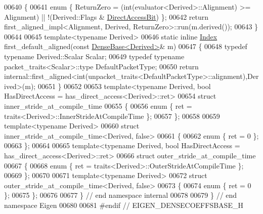 \begin{DoxyCode}
00640 \{
00641   \textcolor{keyword}{enum} \{ ReturnZero = (int(evaluator<Derived>::Alignment) >= Alignment) || !(Derived::Flags & 
      \hyperlink{group__flags_gabf1e9d0516a933445a4c307ad8f14915}{DirectAccessBit}) \};
00642   \textcolor{keywordflow}{return} first\_aligned\_impl<Alignment, Derived, ReturnZero>::run(m.derived());
00643 \}
00644 
00645 \textcolor{keyword}{template}<\textcolor{keyword}{typename} Derived>
00646 \textcolor{keyword}{static} \textcolor{keyword}{inline} \hyperlink{group___core___module_a554f30542cc2316add4b1ea0a492ff02}{Index} first\_default\_aligned(\textcolor{keyword}{const} \hyperlink{group___core___module_class_eigen_1_1_dense_base}{DenseBase<Derived>}& m)
00647 \{
00648   \textcolor{keyword}{typedef} \textcolor{keyword}{typename} Derived::Scalar Scalar;
00649   \textcolor{keyword}{typedef} \textcolor{keyword}{typename} packet\_traits<Scalar>::type DefaultPacketType;
00650   \textcolor{keywordflow}{return} internal::first\_aligned<int(unpacket\_traits<DefaultPacketType>::alignment),Derived>(m);
00651 \}
00652 
00653 template<typename Derived, bool HasDirectAccess = has\_direct\_access<Derived>::ret>
00654 \textcolor{keyword}{struct }inner\_stride\_at\_compile\_time
00655 \{
00656   \textcolor{keyword}{enum} \{ ret = traits<Derived>::InnerStrideAtCompileTime \};
00657 \};
00658 
00659 \textcolor{keyword}{template}<\textcolor{keyword}{typename} Derived>
00660 \textcolor{keyword}{struct }inner\_stride\_at\_compile\_time<Derived, false>
00661 \{
00662   \textcolor{keyword}{enum} \{ ret = 0 \};
00663 \};
00664 
00665 template<typename Derived, bool HasDirectAccess = has\_direct\_access<Derived>::ret>
00666 \textcolor{keyword}{struct }outer\_stride\_at\_compile\_time
00667 \{
00668   \textcolor{keyword}{enum} \{ ret = traits<Derived>::OuterStrideAtCompileTime \};
00669 \};
00670 
00671 \textcolor{keyword}{template}<\textcolor{keyword}{typename} Derived>
00672 \textcolor{keyword}{struct }outer\_stride\_at\_compile\_time<Derived, false>
00673 \{
00674   \textcolor{keyword}{enum} \{ ret = 0 \};
00675 \};
00676 
00677 \} \textcolor{comment}{// end namespace internal}
00678 
00679 \} \textcolor{comment}{// end namespace Eigen}
00680 
00681 \textcolor{preprocessor}{#endif // EIGEN\_DENSECOEFFSBASE\_H}
\end{DoxyCode}
